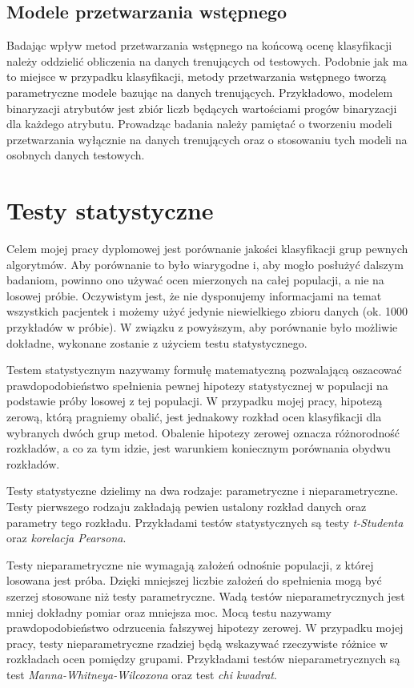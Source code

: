 \documentclass[../thesis.tex]{subfiles}
\begin{document}
\subsection{Modele przetwarzania wstępnego}

Badając wpływ metod przetwarzania wstępnego na końcową ocenę klasyfikacji należy oddzielić obliczenia na danych trenujących od testowych. Podobnie jak ma to miejsce w przypadku klasyfikacji, metody przetwarzania wstępnego tworzą parametryczne modele bazując na danych trenujących. Przykładowo, modelem binaryzacji atrybutów jest zbiór liczb będących wartościami progów binaryzacji dla każdego atrybutu. Prowadząc badania należy pamiętać o tworzeniu modeli przetwarzania wyłącznie na danych trenujących oraz o stosowaniu tych modeli na osobnych danych testowych.

\section{Testy statystyczne}

Celem mojej pracy dyplomowej jest porównanie jakości klasyfikacji grup pewnych algorytmów. Aby porównanie to było wiarygodne i, aby mogło posłużyć dalszym badaniom, powinno ono używać ocen mierzonych na całej populacji, a nie na losowej próbie. Oczywistym jest, że nie dysponujemy informacjami na temat wszystkich pacjentek i możemy użyć jedynie niewielkiego zbioru danych (ok. 1000 przykładów w próbie). W związku z powyższym, aby porównanie było możliwie dokładne, wykonane zostanie z użyciem testu statystycznego.

Testem statystycznym nazywamy formułę matematyczną pozwalającą oszacować prawdopodobieństwo spełnienia pewnej hipotezy statystycznej w populacji na podstawie próby losowej z tej populacji. W przypadku mojej pracy, hipotezą zerową, którą pragniemy obalić, jest jednakowy rozkład ocen klasyfikacji dla wybranych dwóch grup metod. Obalenie hipotezy zerowej oznacza różnorodność rozkładów, a co za tym idzie, jest warunkiem koniecznym porównania obydwu rozkładów.

Testy statystyczne dzielimy na dwa rodzaje: parametryczne i nieparametryczne. Testy pierwszego rodzaju zakładają pewien ustalony rozkład danych oraz parametry tego rozkładu. Przykładami testów statystycznych są testy \emph{t-Studenta} oraz \emph{korelacja Pearsona}.

Testy nieparametryczne nie wymagają założeń odnośnie populacji, z której losowana jest próba. Dzięki mniejszej liczbie założeń do spełnienia mogą być szerzej stosowane niż testy parametryczne. Wadą testów nieparametrycznych jest mniej dokładny pomiar oraz mniejsza moc. Mocą testu nazywamy prawdopodobieństwo odrzucenia fałszywej hipotezy zerowej. W przypadku mojej pracy, testy nieparametryczne rzadziej będą wskazywać rzeczywiste różnice w rozkładach ocen pomiędzy grupami. Przykładami testów nieparametrycznych są test \emph{Manna-Whitneya-Wilcoxona} oraz test \emph{chi kwadrat}. 
\end{document}
